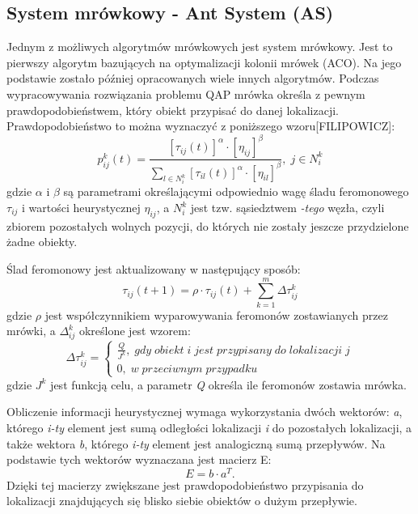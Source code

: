 \subsection{System mrówkowy - Ant System (AS)}
Jednym z możliwych algorytmów mrówkowych jest system mrówkowy. Jest to pierwszy algorytm bazujących na optymalizacji kolonii mrówek (ACO). Na jego podstawie zostało później opracowanych wiele innych algorytmów. Podczas wypracowywania rozwiązania problemu QAP mrówka określa z pewnym prawdopodobieństwem, który obiekt przypisać do danej lokalizacji. Prawdopodobieństwo to można wyznaczyć z poniższego wzoru[FILIPOWICZ]:
\newline
\begin{equation}
p_{ij}^k(t)=\frac{[\tau_{ij}(t)]^\alpha\cdot[\eta_{ij}]^\beta}{\sum\limits_{l\in N_i^k} [\tau_{il}(t)]^\alpha\cdot[\eta_{il}]^\beta}, \; j \in N_i^k
\end{equation}
\newline
gdzie $\alpha$ i $\beta$ są parametrami  określającymi odpowiednio wagę śladu feromonowego $\tau_{ij}$ i wartości heurystycznej $\eta_{ij}$, a $N_i^k$ jest tzw. sąsiedztwem \textit{-tego} węzła, czyli zbiorem pozostałych wolnych pozycji, do których nie zostały jeszcze przydzielone żadne obiekty.

Ślad feromonowy jest aktualizowany w następujący sposób:
\newline
\begin{equation}
\tau_{ij}(t+1)= \rho \cdot \tau_{ij}(t)+\sum\limits_{k=1}^m \Delta \tau_{ij}^k
\end{equation}
\newline
gdzie $\rho$ jest współczynnikiem wyparowywania feromonów zostawianych przez mrówki, a $\Delta_{ij}^k$ określone jest wzorem:
\newline
\begin{equation}
\Delta \tau_{ij}^k = \left\{ \begin{array}{ccc} \frac{Q}{J^k}, \; gdy \; obiekt \; i \; jest \; przypisany \; do \; lokalizacji \; j \\ 0, \; w \; przeciwnym \;  przypadku \end{array} \right.
\end{equation}
\newline
gdzie $J^k$ jest funkcją celu, a parametr \textit{Q} określa ile feromonów zostawia mrówka.

Obliczenie informacji heurystycznej wymaga wykorzystania dwóch wektorów: \textit{a}, którego \textit{i-ty} element jest sumą odległości lokalizacji \textit{i} do pozostałych lokalizacji, a także wektora \textit{b}, którego \textit{i-ty} element jest analogiczną sumą przepływów. Na podstawie tych wektorów wyznaczana jest macierz E:
\newline
\begin{equation}
E=b \cdot a^T.
\end{equation}
\newline
Dzięki tej macierzy zwiększane jest prawdopodobieństwo przypisania do lokalizacji znajdujących się blisko siebie obiektów o dużym przepływie.


